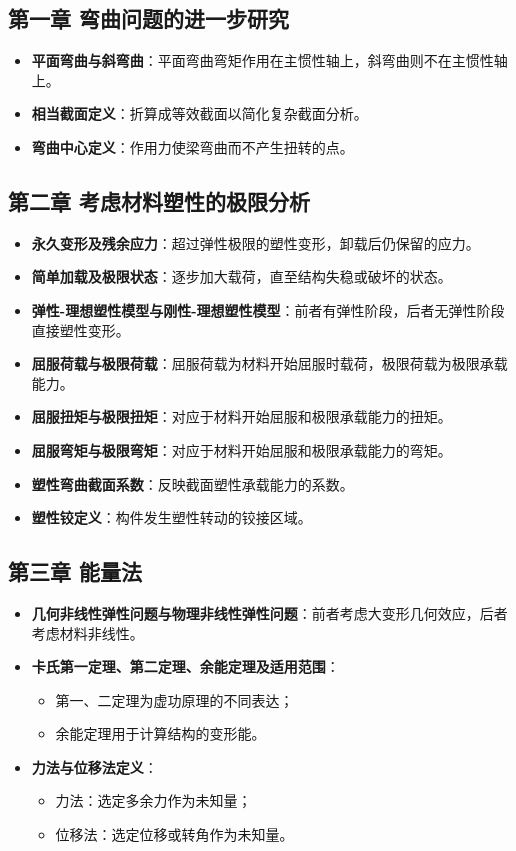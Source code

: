 \documentclass[12pt,a4paper]{article}
\begin{document}
\subsection*{第一章 弯曲问题的进一步研究}
\begin{itemize}
  \item \textbf{平面弯曲与斜弯曲}：平面弯曲弯矩作用在主惯性轴上，斜弯曲则不在主惯性轴上。
  \item \textbf{相当截面定义}：折算成等效截面以简化复杂截面分析。
  \item \textbf{弯曲中心定义}：作用力使梁弯曲而不产生扭转的点。
\end{itemize}

\subsection*{第二章 考虑材料塑性的极限分析}
\begin{itemize}
  \item \textbf{永久变形及残余应力}：超过弹性极限的塑性变形，卸载后仍保留的应力。
  \item \textbf{简单加载及极限状态}：逐步加大载荷，直至结构失稳或破坏的状态。
  \item \textbf{弹性-理想塑性模型与刚性-理想塑性模型}：前者有弹性阶段，后者无弹性阶段直接塑性变形。
  \item \textbf{屈服荷载与极限荷载}：屈服荷载为材料开始屈服时载荷，极限荷载为极限承载能力。
  \item \textbf{屈服扭矩与极限扭矩}：对应于材料开始屈服和极限承载能力的扭矩。
  \item \textbf{屈服弯矩与极限弯矩}：对应于材料开始屈服和极限承载能力的弯矩。
  \item \textbf{塑性弯曲截面系数}：反映截面塑性承载能力的系数。
  \item \textbf{塑性铰定义}：构件发生塑性转动的铰接区域。
\end{itemize}

\subsection*{第三章 能量法}
\begin{itemize}
  \item \textbf{几何非线性弹性问题与物理非线性弹性问题}：前者考虑大变形几何效应，后者考虑材料非线性。
  \item \textbf{卡氏第一定理、第二定理、余能定理及适用范围}：
    \begin{itemize}
      \item 第一、二定理为虚功原理的不同表达；
      \item 余能定理用于计算结构的变形能。
    \end{itemize}
  \item \textbf{力法与位移法定义}：
    \begin{itemize}
      \item 力法：选定多余力作为未知量；
      \item 位移法：选定位移或转角作为未知量。
    \end{itemize}
\end{itemize}
\end{document}
